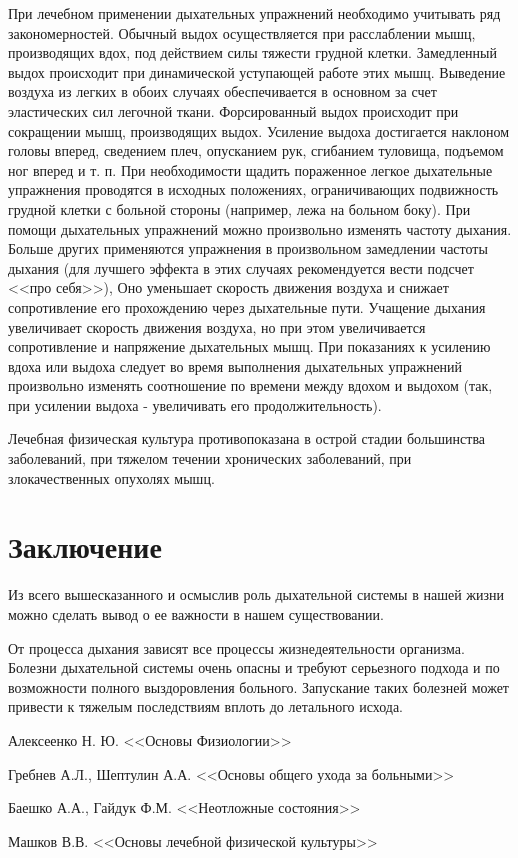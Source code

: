 \documentclass[a4paper,14pt]{extreport}
\begin{document}
При лечебном применении дыхательных упражнений необходимо учитывать ряд закономерностей. Обычный выдох осуществляется при расслаблении мышц, производящих вдох, под действием силы тяжести грудной клетки. Замедленный выдох происходит при динамической уступающей работе этих мышц. Выведение воздуха из легких в обоих случаях обеспечивается в основном за счет эластических сил легочной ткани. Форсированный выдох происходит при сокращении мышц, производящих выдох. Усиление выдоха достигается наклоном головы вперед, сведением плеч, опусканием рук, сгибанием туловища, подъемом ног вперед и т. п. При необходимости щадить пораженное легкое дыхательные упражнения проводятся в исходных положениях, ограничивающих подвижность грудной клетки с больной стороны (например, лежа на больном боку). При помощи дыхательных упражнений можно произвольно изменять частоту дыхания. Больше других применяются упражнения в произвольном замедлении частоты дыхания (для лучшего эффекта в этих случаях рекомендуется вести подсчет <<про себя>>), Оно уменьшает скорость движения воздуха и снижает сопротивление его прохождению через дыхательные пути. Учащение дыхания увеличивает скорость движения воздуха, но при этом увеличивается сопротивление и напряжение дыхательных мышц. При показаниях к усилению вдоха или выдоха следует во время выполнения дыхательных упражнений произвольно изменять соотношение по времени между вдохом и выдохом (так, при усилении выдоха - увеличивать его продолжительность).

Лечебная физическая культура противопоказана в острой стадии большинства заболеваний, при тяжелом течении хронических заболеваний, при злокачественных опухолях мышц.

\chapter*{Заключение}

Из всего вышесказанного и осмыслив роль дыхательной системы в нашей жизни можно сделать  вывод  о ее важности в нашем существовании.

От   процесса дыхания зависят все  процессы жизнедеятельности организма.  Болезни дыхательной системы  очень опасны и требуют серьезного подхода и по возможности полного выздоровления  больного. Запускание таких болезней может привести к тяжелым последствиям вплоть до летального исхода.

\begin{thebibliography}{99}

 Алексеенко Н. Ю. <<Основы  Физиологии>>

 Гребнев А.Л., Шептулин А.А. <<Основы общего ухода за больными>>

 Баешко А.А., Гайдук Ф.М. <<Неотложные состояния>>

 Машков В.В. <<Основы лечебной физической культуры>>

\end{thebibliography}
\end{document}
